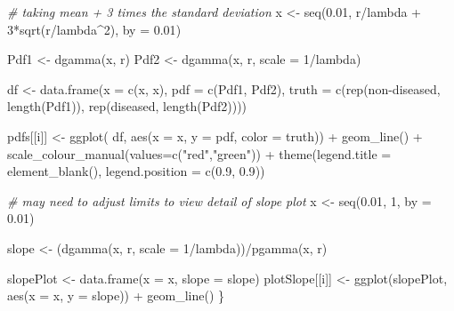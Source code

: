 \documentclass[
]{book}
\newenvironment{Shaded}{\begin{snugshade}}{\end{snugshade}}
\newcommand{\AttributeTok}[1]{\textcolor[rgb]{0.77,0.63,0.00}{#1}}
\newcommand{\CommentTok}[1]{\textcolor[rgb]{0.56,0.35,0.01}{\textit{#1}}}
\newcommand{\DecValTok}[1]{\textcolor[rgb]{0.00,0.00,0.81}{#1}}
\newcommand{\FloatTok}[1]{\textcolor[rgb]{0.00,0.00,0.81}{#1}}
\newcommand{\FunctionTok}[1]{\textcolor[rgb]{0.00,0.00,0.00}{#1}}
\newcommand{\NormalTok}[1]{#1}
\newcommand{\OtherTok}[1]{\textcolor[rgb]{0.56,0.35,0.01}{#1}}
\newcommand{\SpecialCharTok}[1]{\textcolor[rgb]{0.00,0.00,0.00}{#1}}
\newcommand{\StringTok}[1]{\textcolor[rgb]{0.31,0.60,0.02}{#1}}
\begin{document}
\begin{Shaded}
\begin{Highlighting}[]
  \CommentTok{\# taking mean + 3 times the standard deviation}
\NormalTok{  x }\OtherTok{\textless{}{-}} \FunctionTok{seq}\NormalTok{(}\FloatTok{0.01}\NormalTok{, r}\SpecialCharTok{/}\NormalTok{lambda }\SpecialCharTok{+} \DecValTok{3}\SpecialCharTok{*}\FunctionTok{sqrt}\NormalTok{(r}\SpecialCharTok{/}\NormalTok{lambda}\SpecialCharTok{\^{}}\DecValTok{2}\NormalTok{), }\AttributeTok{by =} \FloatTok{0.01}\NormalTok{)}
  
\NormalTok{  Pdf1 }\OtherTok{\textless{}{-}} \FunctionTok{dgamma}\NormalTok{(x, r)}
\NormalTok{  Pdf2 }\OtherTok{\textless{}{-}} \FunctionTok{dgamma}\NormalTok{(x, r, }\AttributeTok{scale =} \DecValTok{1}\SpecialCharTok{/}\NormalTok{lambda)}
  
\NormalTok{  df }\OtherTok{\textless{}{-}} \FunctionTok{data.frame}\NormalTok{(}\AttributeTok{x =} \FunctionTok{c}\NormalTok{(x, x), }\AttributeTok{pdf =} \FunctionTok{c}\NormalTok{(Pdf1, Pdf2), }
                   \AttributeTok{truth =} \FunctionTok{c}\NormalTok{(}\FunctionTok{rep}\NormalTok{(}\StringTok{\textquotesingle{}non{-}diseased\textquotesingle{}}\NormalTok{, }\FunctionTok{length}\NormalTok{(Pdf1)), }
                             \FunctionTok{rep}\NormalTok{(}\StringTok{\textquotesingle{}diseased\textquotesingle{}}\NormalTok{, }\FunctionTok{length}\NormalTok{(Pdf2))))}
  
\NormalTok{  pdfs[[i]] }\OtherTok{\textless{}{-}} \FunctionTok{ggplot}\NormalTok{(}
\NormalTok{    df, }\FunctionTok{aes}\NormalTok{(}\AttributeTok{x =}\NormalTok{ x, }\AttributeTok{y =}\NormalTok{ pdf, }\AttributeTok{color =}\NormalTok{ truth)) }\SpecialCharTok{+} 
    \FunctionTok{geom\_line}\NormalTok{() }\SpecialCharTok{+} 
    \FunctionTok{scale\_colour\_manual}\NormalTok{(}\AttributeTok{values=}\FunctionTok{c}\NormalTok{(}\StringTok{"red"}\NormalTok{,}\StringTok{"green"}\NormalTok{)) }\SpecialCharTok{+} 
    \FunctionTok{theme}\NormalTok{(}\AttributeTok{legend.title =} \FunctionTok{element\_blank}\NormalTok{(), }
          \AttributeTok{legend.position =} \FunctionTok{c}\NormalTok{(}\FloatTok{0.9}\NormalTok{, }\FloatTok{0.9}\NormalTok{))}
  
  \CommentTok{\# may need to adjust limits to view detail of slope plot}
\NormalTok{  x }\OtherTok{\textless{}{-}} \FunctionTok{seq}\NormalTok{(}\FloatTok{0.01}\NormalTok{, }\DecValTok{1}\NormalTok{, }\AttributeTok{by =} \FloatTok{0.01}\NormalTok{)}

\NormalTok{  slope }\OtherTok{\textless{}{-}}\NormalTok{ (}\FunctionTok{dgamma}\NormalTok{(x, r, }\AttributeTok{scale =} \DecValTok{1}\SpecialCharTok{/}\NormalTok{lambda))}\SpecialCharTok{/}\FunctionTok{pgamma}\NormalTok{(x, r)}

\NormalTok{  slopePlot }\OtherTok{\textless{}{-}} \FunctionTok{data.frame}\NormalTok{(}\AttributeTok{x =}\NormalTok{ x, }\AttributeTok{slope =}\NormalTok{ slope)}
\NormalTok{  plotSlope[[i]] }\OtherTok{\textless{}{-}} \FunctionTok{ggplot}\NormalTok{(slopePlot, }\FunctionTok{aes}\NormalTok{(}\AttributeTok{x =}\NormalTok{ x, }\AttributeTok{y =}\NormalTok{ slope)) }\SpecialCharTok{+} \FunctionTok{geom\_line}\NormalTok{()}
\NormalTok{\}}
\end{Highlighting}
\end{Shaded}
\end{document}
